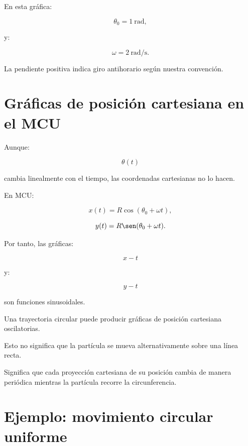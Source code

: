En esta gráfica:

\[
\theta_0=\SI{1}{\radian},
\]

y:

\[
\omega=\SI{2}{\radian\per\second}.
\]

La pendiente positiva indica giro antihorario según nuestra convención.


\section{Gráficas de posición cartesiana en el MCU}

Aunque:

\[
\theta(t)
\]

cambia linealmente con el tiempo, las coordenadas cartesianas no lo hacen.

En MCU:

\[
x(t)=R\cos(\theta_0+\omega t),
\]

\[
y(t)=R\sen(\theta_0+\omega t).
\]

Por tanto, las gráficas:

\[
x-t
\]

y:

\[
y-t
\]

son funciones sinusoidales.

\begin{interpretacion}

Una trayectoria circular puede producir gráficas de posición cartesiana
oscilatorias.

Esto no significa que la partícula se mueva alternativamente sobre una línea
recta.

Significa que cada proyección cartesiana de su posición cambia de manera
periódica mientras la partícula recorre la circunferencia.

\end{interpretacion}


\section{Ejemplo: movimiento circular uniforme}

